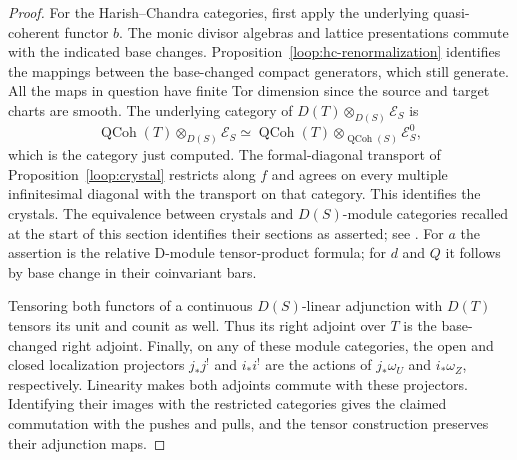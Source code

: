 \begin{proof}
For the Harish--Chandra categories, first apply the underlying
quasi-coherent functor $b$.  The monic divisor algebras and lattice
presentations commute with the indicated base changes.
Proposition~\ref{loop:hc-renormalization} identifies the mappings
between the base-changed compact generators, which still generate.
All the maps in question have finite Tor dimension since the source
and target charts are smooth.  The underlying category of
$D(T)\otimes_{D(S)}\mathcal E_S$ is
\[
 \operatorname{QCoh}(T)\otimes_{D(S)}\mathcal E_S
 \simeq\operatorname{QCoh}(T)\otimes_{\operatorname{QCoh}(S)}
                   \mathcal E_S^0,
\]
which is the category just computed.  The formal-diagonal transport
of Proposition~\ref{loop:crystal} restricts along $f$ and agrees on
every multiple infinitesimal diagonal with the transport on that
category.  This identifies the crystals.  The equivalence between
crystals and $D(S)$-module categories recalled at the start of this
section identifies their sections as asserted; see
\cite[Theorem~2.6.3 and Lemma~3.2.4]{Gaitsgory1Affine}.
For $a$ the assertion is the relative D-module tensor-product formula;
for $d$ and $Q$ it follows by base change in their coinvariant bars.

Tensoring both functors of a continuous $D(S)$-linear adjunction with
$D(T)$ tensors its unit and counit as well.  Thus its right adjoint
over $T$ is the base-changed right adjoint.  Finally, on any of these
module categories, the open and closed localization projectors
$j_*j^!$ and $i_*i^!$ are the actions of $j_*\omega_U$ and
$i_*\omega_Z$, respectively.  Linearity makes both adjoints commute with these
projectors.  Identifying their images with the restricted categories
gives the claimed commutation with the pushes and pulls, and the
tensor construction preserves their adjunction maps.
\end{proof}
